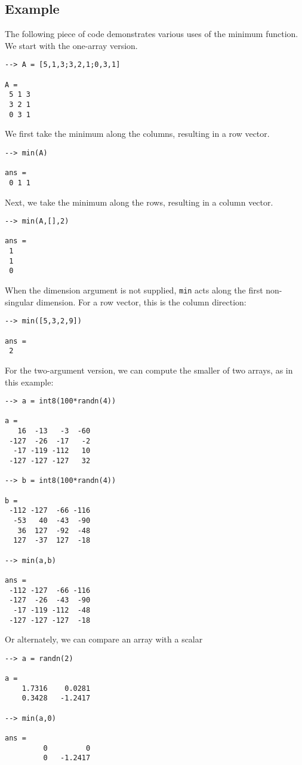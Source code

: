 \subsection{Example}

The following piece of code demonstrates various uses of the minimum
function.  We start with the one-array version.
\begin{verbatim}
--> A = [5,1,3;3,2,1;0,3,1]

A = 
 5 1 3 
 3 2 1 
 0 3 1 
\end{verbatim}
We first take the minimum along the columns, resulting in a row vector.
\begin{verbatim}
--> min(A)

ans = 
 0 1 1 
\end{verbatim}
Next, we take the minimum along the rows, resulting in a column vector.
\begin{verbatim}
--> min(A,[],2)

ans = 
 1 
 1 
 0 
\end{verbatim}
When the dimension argument is not supplied, \verb|min| acts along the first 
non-singular dimension.  For a row vector, this is the column direction:
\begin{verbatim}
--> min([5,3,2,9])

ans = 
 2 
\end{verbatim}

For the two-argument version, we can compute the smaller of two arrays,
as in this example:
\begin{verbatim}
--> a = int8(100*randn(4))

a = 
   16  -13   -3  -60 
 -127  -26  -17   -2 
  -17 -119 -112   10 
 -127 -127 -127   32 

--> b = int8(100*randn(4))

b = 
 -112 -127  -66 -116 
  -53   40  -43  -90 
   36  127  -92  -48 
  127  -37  127  -18 

--> min(a,b)

ans = 
 -112 -127  -66 -116 
 -127  -26  -43  -90 
  -17 -119 -112  -48 
 -127 -127 -127  -18 
\end{verbatim}
Or alternately, we can compare an array with a scalar
\begin{verbatim}
--> a = randn(2)

a = 
    1.7316    0.0281 
    0.3428   -1.2417 

--> min(a,0)

ans = 
         0         0 
         0   -1.2417 
\end{verbatim}
